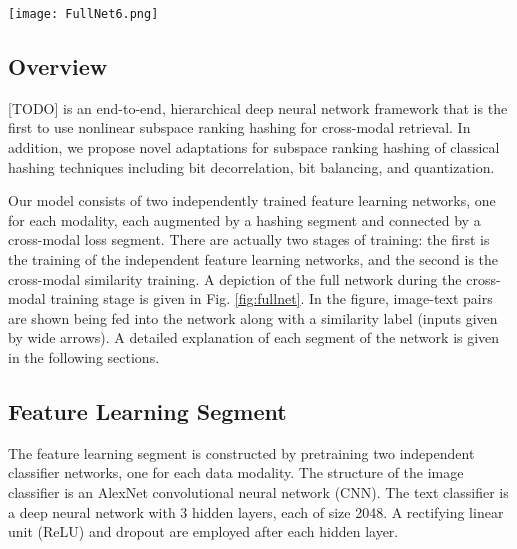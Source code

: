 \documentclass[letterpaper]{article}
\begin{document}
\begin{figure*}
	\centering
	\texttt{[image: FullNet6.png]}
	\caption{\label{fig:fullnet}Full Network structure for deep cross-modal hashing. Inputs to the network are given by the wide arrows. The network consists of three segments: the classification segment, the hashing segment, and the loss segment. [TODO]}
\end{figure*}

\subsection{Overview}

[TODO] is an end-to-end, hierarchical deep neural network framework that is the first to use nonlinear subspace ranking hashing for cross-modal retrieval. In addition, we propose novel adaptations for subspace ranking hashing of classical hashing techniques including bit decorrelation, bit balancing, and quantization.

Our model consists of two independently trained feature learning networks, one for each modality, each augmented by a hashing segment and connected by a cross-modal loss segment. There are actually two stages of training: the first is the training of the independent feature learning networks, and the second is the cross-modal similarity training. A depiction of the full network during the cross-modal training stage is given in Fig. \ref{fig:fullnet}. In the figure, image-text pairs are shown being fed into the network along with a similarity label (inputs given by wide arrows). A detailed explanation of each segment of the network is given in the following sections. 

\subsection{Feature Learning Segment}

The feature learning segment is constructed by pretraining two independent classifier networks, one for each data modality. The structure of the image classifier is an AlexNet \cite{alexnet} convolutional neural network (CNN). The text classifier is a deep neural network with 3 hidden layers, each of size 2048. A rectifying linear unit (ReLU) and dropout are employed after each hidden layer. 

\begin{comment}
The dimensionality of the final layer of the classifiers (not depicted in Fig. \ref{fig:fullnet}) is dependent on the dataset. For the MIRFLICKR \cite{flickr} dataset, images and text belong to one or more of 24 class labels; thus, the final layer would consist of 24 output neurons, each giving the probability of the input text or image belonging to the corresponding class.
\end{comment}
\end{document}
